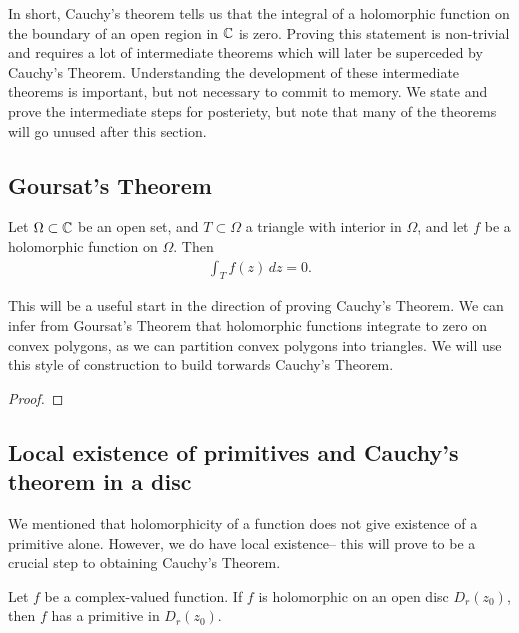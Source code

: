 \documentclass{memoir}
\begin{document}
In short, Cauchy's theorem tells us that the integral of a holomorphic function on the boundary of an open region in \(\mathbb{C}\) is zero. Proving this statement is non-trivial and requires a lot of intermediate theorems which will later be superceded by Cauchy's Theorem. Understanding the development of these intermediate theorems is important, but not necessary to commit to memory. We state and prove the intermediate steps for posteriety, but note that many of the theorems will go unused after this section.

\subsection{Goursat's Theorem}
\label{sec:goursat_s_theorem}
\begin{thm}
	Let \(\Omega \subset \mathbb{C}\) be an open set, and \(T\subset \Omega \) a triangle with interior in \(\Omega \), and let \(f\) be a holomorphic function on \(\Omega \). Then
	\begin{align*}
		\int_T f(z) \,d z = 0.
	\end{align*}
\end{thm}

This will be a useful start in the direction of proving Cauchy's Theorem. We can infer from Goursat's Theorem that holomorphic functions integrate to zero on convex polygons, as we can partition convex polygons into triangles. We will use this style of construction to build torwards Cauchy's Theorem.

\begin{proof}%
	
\end{proof}

\subsection{Local existence of primitives and Cauchy's theorem in a disc}
\label{sub:local_existence_of_primitives_and_cauchy_s_theorem_in_a_disc}

We mentioned that holomorphicity of a function does not give existence of a primitive alone. However, we do have local existence-- this will prove to be a crucial step to obtaining Cauchy's Theorem.

\begin{thm}
	Let \(f\) be a complex-valued function. If \(f\) is holomorphic on an open disc \(D_r(z_0)\), then \(f\) has a primitive in \(D_r(z_0)\).
\end{thm}
\end{document}
